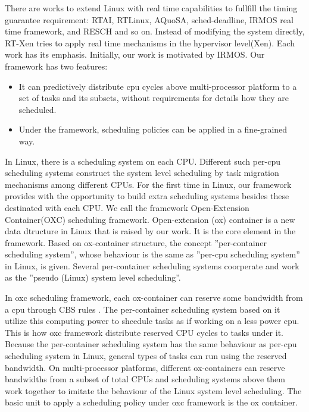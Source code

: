 There are works to extend Linux with real time capabilities to fullfill 
the timing guarantee requirement: RTAI, RTLinux, AQuoSA\cite{Luigi09}, 
sched-deadline\cite{Dario09},
IRMOS real time framework, and RESCH and so on.
Instead of modifying the system directly, RT-Xen tries to apply real time
mechanisms in the hypervisor level(Xen).
Each work has its emphasis. Initially, our work is motivated by IRMOS.
Our framework has two features:
\begin{itemize}
\item 	It can predictively distribute cpu 
      	cycles above multi-processor platform to a set of tasks 
	and its subsets, without requirements for details how they 
	are scheduled. 
\item 	Under the framework, scheduling policies can be applied in a
	fine-grained way.
\end{itemize}

In Linux, there is a scheduling system on each CPU. Different such per-cpu 
scheduling systems construct the system level scheduling by task
migration mechanisms among different CPUs. 
For the first time in Linux, our framework provides with the opportunity to 
build extra scheduling systems besides these destinated with each CPU.
We call the framework Open-Extension Container(OXC) scheduling framework. 
Open-extension (ox) container is a new data dtructure in Linux that is 
raised by our work. It is the core element in the framework.
Based on ox-container structure, the concept ''per-container scheduling
system'', whose behaviour is the same as ''per-cpu scheduling system''
in Linux, is given. Several per-container scheduling systems coorperate
and work as the ''pseudo (Linux) system level scheduling''.  

In oxc scheduling framework, each ox-container can reserve some bandwidth 
from a cpu through CBS rules \cite{AbeniB98}. The per-container scheduling system based on
it utilize this computing power to shcedule tasks as if working on a less
power cpu. This is how oxc framework distribute reserved CPU cycles to
tasks under it. 
Because the per-container scheduling system has the same behaviour
as per-cpu scheduling system in Linux, general types of tasks can run 
using the reserved bandwidth. On multi-processor platforms, different
ox-containers can reserve bandwidths from a subset of total CPUs and 
scheduling systems above them work together to imitate the behaviour of 
the Linux system level scheduling. The basic unit to 
apply a scheduling policy under oxc framework is the ox container.
